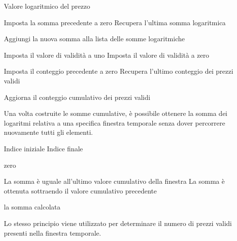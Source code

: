 \documentclass[a4paper,oneside,italian]{sapthesis}
\begin{document}
\begin{algorithm}[H]
\caption{Aggiornamento delle strutture cumulative}
\label{alg:electricity-grid-prefix}
\begin{algorithmic}[1]

\Require Valore logaritmico del prezzo

    \State Imposta la somma precedente a zero
\Else
    \State Recupera l'ultima somma logaritmica
\EndIf

\State Aggiungi la nuova somma alla lista delle somme logaritmiche

    \State Imposta il valore di validità a uno
\Else
    \State Imposta il valore di validità a zero
\EndIf

    \State Imposta il conteggio precedente a zero
\Else
    \State Recupera l'ultimo conteggio dei prezzi validi
\EndIf

\State Aggiorna il conteggio cumulativo dei prezzi validi

\end{algorithmic}
\end{algorithm}

Una volta costruite le somme cumulative, è possibile ottenere la somma dei
logaritmi relativa a una specifica finestra temporale senza dover percorrere
nuovamente tutti gli elementi.

\begin{algorithm}[H]
\caption{Calcolo della somma dei logaritmi}
\label{alg:electricity-grid-log-sum}
\begin{algorithmic}[1]

\Require Indice iniziale
\Require Indice finale

    \State \Return zero
\EndIf

    \State La somma è uguale all'ultimo valore cumulativo della finestra
\Else
    \State La somma è ottenuta sottraendo il valore cumulativo precedente
\EndIf

\State \Return la somma calcolata

\end{algorithmic}
\end{algorithm}

Lo stesso principio viene utilizzato per determinare il numero di prezzi
validi presenti nella finestra temporale.
\end{document}
